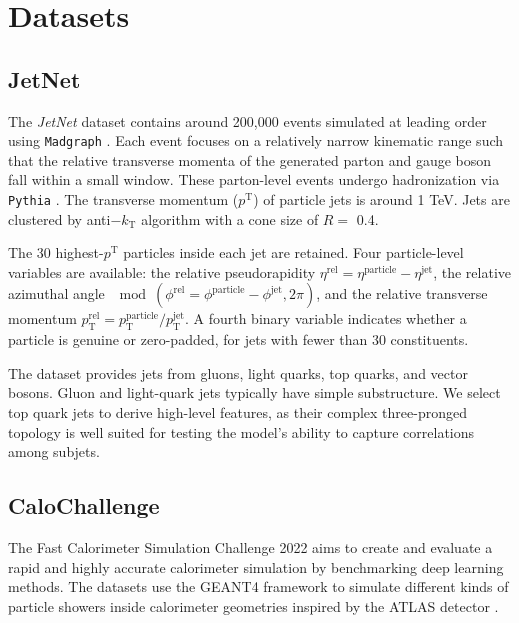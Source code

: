 \documentclass[%
 reprint,
 amsmath,amssymb,
 aps,
prd,
floatfix,
]{revtex4-2}
\begin{document}
\section{Datasets}\label{sec3}

\subsection{JetNet}\label{subsec3.1}
The \textit{JetNet} dataset \cite{jetnet} contains around 200,000 events simulated at leading order using \verb+Madgraph+ \cite{madgraph}. Each event focuses on a relatively narrow kinematic range such that the relative transverse momenta of the generated parton and gauge boson fall within a small window. These parton-level events undergo hadronization via \verb+Pythia+ \cite{pythia}. The transverse momentum ($p^\mathrm{T}$) of particle jets is around 1 TeV. Jets are clustered by anti$-k_\mathrm{T}$ algorithm with a cone size of $R =$ 0.4. 

The 30 highest-$p^\mathrm{T}$ particles inside each jet are retained. Four particle-level variables are available: the relative pseudorapidity $\eta^\mathrm{rel} = \eta^\mathrm{particle} - \eta^\mathrm{jet}$, the relative azimuthal angle $\mod{(\phi^\mathrm{rel} = \phi^\mathrm{particle} - \phi^\mathrm{jet}, 2 \pi)}$, and the relative transverse momentum $p^\mathrm{rel}_\mathrm{T} = p^\mathrm{particle}_\mathrm{T}/p^\mathrm{jet}_\mathrm{T}$. A fourth binary variable indicates whether a particle is genuine or zero-padded, for jets with fewer than 30 constituents.

The dataset provides jets from gluons, light quarks, top quarks, and vector bosons. Gluon and light-quark jets typically have simple substructure. We select top quark jets to derive high-level features, as their complex three-pronged topology is well suited for testing the model's ability to capture correlations among subjets.

\subsection{CaloChallenge}\label{subsec3.2}

The Fast Calorimeter Simulation Challenge 2022 \cite{calochallenge} aims to create and evaluate a rapid and highly accurate calorimeter simulation by benchmarking deep learning methods. The datasets use the GEANT4 \cite{GEANT4:2002zbu} framework to simulate different kinds of particle showers inside calorimeter geometries inspired by the ATLAS detector \cite{atlas}.
\end{document}

